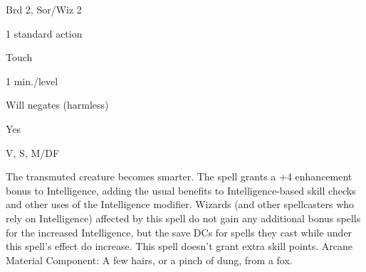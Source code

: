 
\begin{description*}
\item[Level:] Brd 2, Sor/Wiz 2
\item[Casting Time:] 1 standard action
\item[Range:] Touch
\item[Duration:] 1 min./level
\item[Saving Throw:] Will negates (harmless)
\item[Spell Resistance:] Yes
\item[Components:] V, S, M/DF
\end{description*}

The transmuted creature becomes smarter. The spell grants a +4 enhancement bonus
to Intelligence, adding the usual benefits to Intelligence-based skill checks and
other uses of the Intelligence modifier. Wizards (and other spellcasters who rely
on Intelligence) affected by this spell do not gain any additional bonus spells
for the increased Intelligence, but the save DCs for spells they cast while under
this spell's effect do increase. This spell doesn't grant extra skill points.
Arcane Material Component: A few hairs, or a pinch of dung, from a fox.